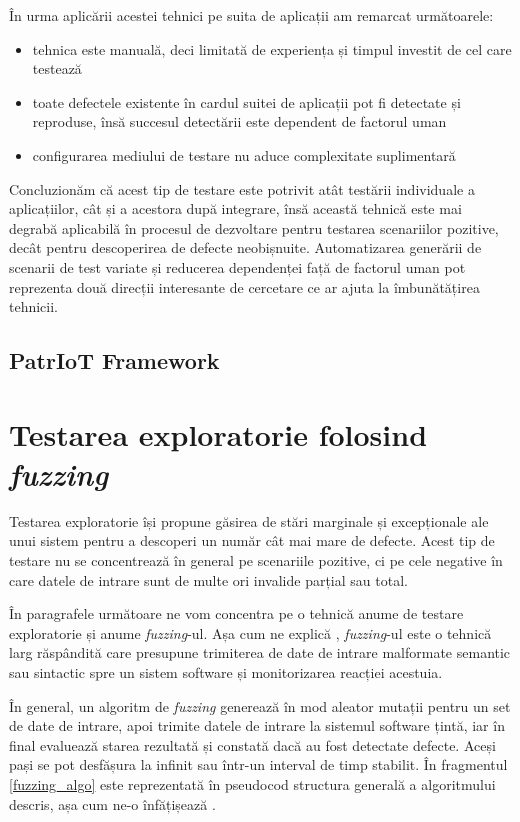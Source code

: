 În urma aplicării acestei tehnici pe suita de aplicații am remarcat următoarele:
\begin{itemize}
    \item tehnica este manuală, deci limitată de experiența și timpul investit de cel care testează
    \item toate defectele existente în cardul suitei de aplicații pot fi detectate și reproduse, însă succesul detectării este dependent de factorul uman
    \item configurarea mediului de testare nu aduce complexitate suplimentară
\end{itemize}

Concluzionăm că acest tip de testare este potrivit atât testării individuale a aplicațiilor, cât și a acestora după integrare, însă această tehnică este mai degrabă aplicabilă în procesul de dezvoltare pentru testarea scenariilor pozitive, decât pentru descoperirea de defecte neobișnuite. Automatizarea generării de scenarii de test variate și reducerea dependenței față de factorul uman pot reprezenta două direcții interesante de cercetare ce ar ajuta la îmbunătățirea tehnicii.

\subsection{PatrIoT Framework}


\section{Testarea exploratorie folosind \emph{fuzzing}}

Testarea exploratorie își propune găsirea de stări marginale și excepționale ale unui sistem pentru a descoperi un număr cât mai mare de defecte. Acest tip de testare nu se concentrează în general pe scenariile pozitive, ci pe cele negative în care datele de intrare sunt de multe ori invalide parțial sau total.

În paragrafele următoare ne vom concentra pe o tehnică anume de testare exploratorie și anume \textit{fuzzing}-ul. Așa cum ne explică \citet{Manes2021}, \textit{fuzzing}-ul este o tehnică larg răspândită care presupune trimiterea de date de intrare malformate semantic sau sintactic spre un sistem software și monitorizarea reacției acestuia. 

În general, un algoritm de \textit{fuzzing} generează în mod aleator mutații pentru un set de date de intrare, apoi trimite datele de intrare la sistemul software țintă, iar în final evaluează starea rezultată și constată dacă au fost detectate defecte. Aceși pași se pot desfășura la infinit sau într-un interval de timp stabilit. În fragmentul \ref{fuzzing_algo} este reprezentată în pseudocod structura generală a algoritmului descris, așa cum ne-o înfățișează \citet{Manes2021}.

